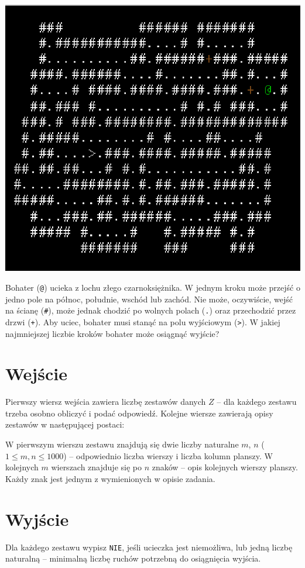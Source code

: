 \documentclass{spiral-kurs}
\begin{document}
\makeheader
%

\begin{center}
\includegraphics[width=0.5 \textwidth]{adom.eps}
\end{center}

  
Bohater (\texttt{@}) ucieka z lochu złego czarnoksiężnika. W jednym kroku może przejść o jedno pole na północ, południe, wschód lub zachód. Nie może, oczywiście, wejść na ścianę (\texttt{\#}), może jednak chodzić po wolnych polach (\texttt{.}) oraz przechodzić przez drzwi (\texttt{+}). 
Aby uciec, bohater musi stanąć na polu wyjściowym  (\texttt{>}). W jakiej najmniejszej liczbie kroków bohater może osiągnąć wyjście?

    \section{Wejście}

Pierwszy wiersz wejścia zawiera liczbę zestawów danych $Z$ -- dla każdego zestawu trzeba osobno obliczyć i podać odpowiedź. Kolejne wiersze zawierają opisy zestawów w następującej postaci:

W pierwszym wierszu zestawu znajdują się dwie liczby naturalne $m$, $n$ ($1 \leq m, n \leq 1000$) -- odpowiednio liczba wierszy i liczba kolumn planszy. W kolejnych $m$ wierszach znajduje się po $n$ znaków -- opis kolejnych wierszy planszy. Każdy znak jest jednym z wymienionych w opisie zadania. 
      
    \section{Wyjście}

Dla każdego zestawu wypisz \texttt{NIE}, jeśli ucieczka jest niemożliwa, lub jedną liczbę naturalną -- minimalną liczbę ruchów potrzebną do osiągnięcia wyjścia.


  
\end{document}
